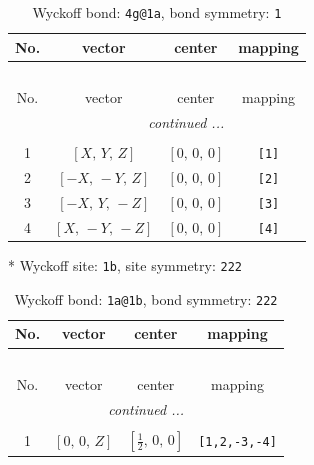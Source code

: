 \documentclass[fleqn,8pt]{jsarticle}
\begin{document}
\begin{longtable}{cccc}
\caption{Wyckoff bond: {\tt 4g@1a}, bond symmetry: {\tt 1}}
 \\
 \hline \hline
No. & vector & center & mapping \\ \hline \endfirsthead

\multicolumn{3}{l}{\tablename\ \thetable{}} \\
 \hline \hline
No. & vector & center & mapping \\ \hline \endhead

 \hline \hline
\multicolumn{3}{r}{\footnotesize\it continued ...} \\ \endfoot

 \hline \hline
\multicolumn{3}{r}{} \\ \endlastfoot

1 & $\left[ X,\, Y,\, Z \right]$ & $\left[ 0,\, 0,\, 0 \right]$ & {\tt [1]} \\ \hline
2 & $\left[ - X,\, - Y,\, Z \right]$ & $\left[ 0,\, 0,\, 0 \right]$ & {\tt [2]} \\ \hline
3 & $\left[ - X,\, Y,\, - Z \right]$ & $\left[ 0,\, 0,\, 0 \right]$ & {\tt [3]} \\ \hline
4 & $\left[ X,\, - Y,\, - Z \right]$ & $\left[ 0,\, 0,\, 0 \right]$ & {\tt [4]} \\
\end{longtable}
* Wyckoff site: {\tt 1b}, site symmetry: {\tt 222}
\renewcommand{\arraystretch}{1.2}
\begin{longtable}{cccc}
\caption{Wyckoff bond: {\tt 1a@1b}, bond symmetry: {\tt 222}}
 \\
 \hline \hline
No. & vector & center & mapping \\ \hline \endfirsthead

\multicolumn{3}{l}{\tablename\ \thetable{}} \\
 \hline \hline
No. & vector & center & mapping \\ \hline \endhead

 \hline \hline
\multicolumn{3}{r}{\footnotesize\it continued ...} \\ \endfoot

 \hline \hline
\multicolumn{3}{r}{} \\ \endlastfoot

1 & $\left[ 0,\, 0,\, Z \right]$ & $\left[ \frac{1}{2},\, 0,\, 0 \right]$ & {\tt [1,2,-3,-4]} \\
\end{longtable}
\renewcommand{\arraystretch}{1.2}
\end{document}
